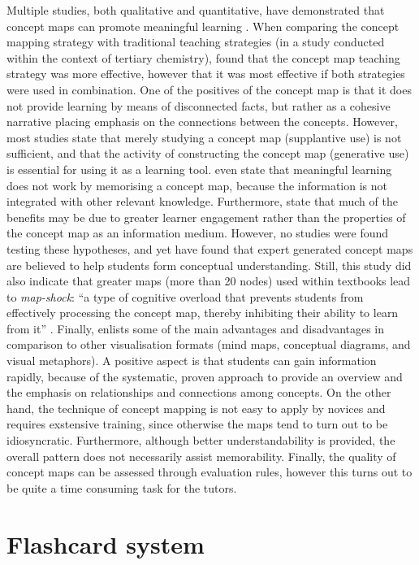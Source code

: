Multiple studies, both qualitative and quantitative, have demonstrated that concept maps can promote meaningful learning \cite{canas, hwang2, nesbit, subramaniam}. When comparing the concept mapping strategy with traditional teaching strategies (in a study conducted within the context of tertiary chemistry),  found that the concept map teaching strategy was more effective, however that it was most effective if both strategies were used in combination. One of the positives of the concept map is that it does not provide learning by means of disconnected facts, but rather as a cohesive narrative placing emphasis on the connections between the concepts. However, most studies state that merely studying a concept map (supplantive use) is not sufficient, and that the activity of constructing the concept map (generative use) is essential for using it as a learning tool.  even state that meaningful learning does not work by memorising a concept map, because the information is not integrated with other relevant knowledge. Furthermore,  state that much of the benefits may be due to greater learner engagement rather than the properties of the concept map as an information medium. However, no studies were found testing these hypotheses, and yet  have found that expert generated concept maps are believed to help students form conceptual understanding. Still, this study did also indicate that greater maps (more than 20 nodes) used within textbooks lead to \emph{map-shock}: ``a type of cognitive overload that prevents students from effectively processing the concept map, thereby inhibiting their ability to learn from it'' \cite[p.~3]{moore}. Finally,  enlists some of the main advantages and disadvantages in comparison to other visualisation formats (mind maps, conceptual diagrams, and visual metaphors). A positive aspect is that students can gain information rapidly, because of the systematic, proven approach to provide an overview and the emphasis on relationships and connections among concepts. On the other hand, the technique of concept mapping is not easy to apply by novices and requires exstensive training, since otherwise the maps tend to turn out to be idiosyncratic. Furthermore, although better understandability is provided, the overall pattern does not necessarily assist memorability. Finally, the quality of concept maps can be assessed through evaluation rules, however this turns out to be quite a time consuming task for the tutors.

\section{Flashcard system}

